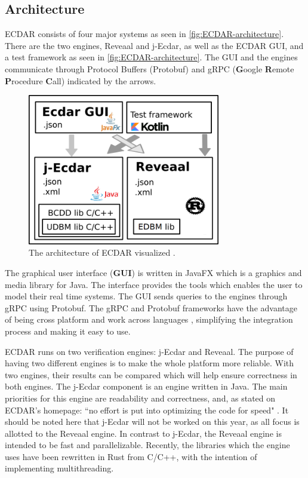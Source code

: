 \subsection{Architecture}\label{sub:architecture}
ECDAR consists of four major systems as seen in \autoref{fig:ECDAR-architecture}.
There are the two engines, Reveaal and j-Ecdar, as well as the ECDAR GUI, and a test framework as seen in \autoref{fig:ECDAR-architecture}. 
The GUI and the engines communicate through Protocol Buffers (Protobuf) and gRPC (\textbf{G}oogle \textbf{R}emote \textbf{P}rocedure \textbf{C}all) indicated by the arrows.
\begin{figure}[H]
    \centering
    \includegraphics[width=0.75\textwidth]{common/figures/ArchOverview.png}
    \caption{The architecture of ECDAR visualized \cite{ECDARNET}.}
    \label{fig:ECDAR-architecture}
\end{figure}

The graphical user interface (\textbf{GUI}) is written in JavaFX \cite{ECDARNET} which is a graphics and media library for Java. 
The interface provides the tools which enables the user to model their real time systems. 
The GUI sends queries to the engines through gRPC using Protobuf. 
The gRPC and Protobuf frameworks have the advantage of being cross platform and work across languages \cite{gRPC}\cite{google_protocol_nodate}, simplifying the integration process and making it easy to use.

ECDAR runs on two verification engines: j-Ecdar and Reveaal. 
The purpose of having two different engines is to make the whole platform more reliable. 
With two engines, their results can be compared which will help ensure correctness in both engines.
The j-Ecdar component is an engine written in Java.
The main priorities for this engine are readability and correctness, and, as stated on ECDAR's homepage: ``no effort is put into optimizing the code for speed" \cite{ECDARNET}.
It should be noted here that j-Ecdar will not be worked on this year, as all focus is allotted to the Reveaal engine.
In contrast to j-Ecdar, the Reveaal engine is intended to be fast and parallelizable. 
Recently, the libraries which the engine uses have been rewritten in Rust from C/C++, with the intention of implementing multithreading. 

